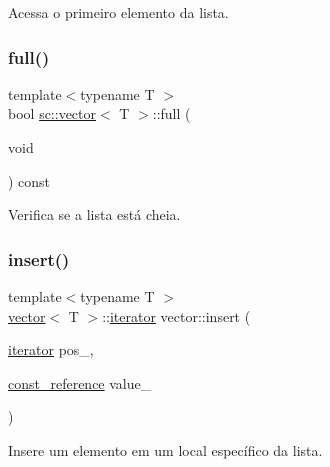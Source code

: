 Acessa o primeiro elemento da lista. 

\mbox{\label{classsc_1_1vector_a0a6b379c96b50cf99cbd51306dd2d491}} 
\subsubsection{\texorpdfstring{full()}{full()}}
{\footnotesize\ttfamily template$<$typename T $>$ \\
bool \hyperlink{classsc_1_1vector}{sc\+::vector}$<$ T $>$\+::full (\begin{DoxyParamCaption}\item[{void}]{ }\end{DoxyParamCaption}) const}



Verifica se a lista está cheia. 

\mbox{\label{classsc_1_1vector_a01e7462fc5e35d8e1081dfe3bf6b62ea}} 
\subsubsection{\texorpdfstring{insert()}{insert()}\hspace{0.1cm}{\footnotesize\ttfamily [1/3]}}
{\footnotesize\ttfamily template$<$typename T $>$ \\
\hyperlink{classsc_1_1vector}{vector}$<$ T $>$\+::\hyperlink{classsc_1_1vector_a9e5d5cc35e379aa27a93989f4a71413c}{iterator} vector\+::insert (\begin{DoxyParamCaption}\item[{\hyperlink{classsc_1_1vector_a9e5d5cc35e379aa27a93989f4a71413c}{iterator}}]{pos\+\_\+,  }\item[{\hyperlink{classsc_1_1vector_a8da2b1a11b069241100f9b2e14f481a0}{const\+\_\+reference}}]{value\+\_\+ }\end{DoxyParamCaption})}



Insere um elemento em um local específico da lista. 

\mbox{\label{classsc_1_1vector_acf2e500da5525a7a0069e2947df98d43}} 
